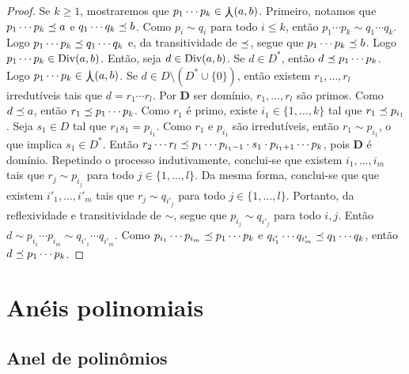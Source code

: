 \begin{proof}
Se $k \geq 1$, mostraremos que $p_1 \cdots p_k \in \mathop{\bigcurlywedge}(a,b)$. Primeiro, notamos que $p_1 \cdots p_k \preceq a$ e $q_1 \cdots q_k \preceq b$. Como $p_i \sim q_i$ para todo $i \leq k$, então $p_1 \cdots p_k \sim q_1 \cdots q_k$. Logo $p_1 \cdots p_k \preceq q_1 \cdots q_k$ e, da transitividade de $\preceq$, segue que $p_1 \cdots p_k \preceq b$. Logo $p_1 \cdots p_k \in \operatorname{Div}(a,b)$. Então, seja $d \in \operatorname{Div}(a,b)$. Se $d \in D^*$, então $d \preceq p_1 \cdots p_k$. Logo $p_1 \cdots p_k \in \mathop{\bigcurlywedge}(a,b)$. Se $d \in D \setminus (D^* \cup \{0\})$, então existem $r_1,\ldots,r_l$ irredutíveis tais que $d = r_1 \cdots r_l$. Por $\bm D$ ser domínio, $r_1,\ldots,r_l$ são primos. Como $d \preceq a$, então $r_1 \preceq p_1 \cdots p_k$. Como $r_1$ é primo, existe $i_1 \in \{1,\ldots,k\}$ tal que $r_1 \preceq p_{i_1}$. Seja $s_1 \in D$ tal que $r_1s_1 = p_{i_1}$. Como $r_1$ e $p_{i_1}$ são irredutíveis, então $r_1 \sim p_{i_1}$, o que implica $s_1 \in D^*$. Então $r_2 \cdots r_l \preceq p_1 \cdots p_{i_1-1} \cdot s_1 \cdot p_{i_1+1} \cdots p_k$, pois $\bm D$ é domínio. Repetindo o processo indutivamente, conclui-se que existem $i_1, \ldots,i_m$ tais que $r_j \sim p_{i_j}$ para todo $j \in \{1,\ldots,l\}$.
Da mesma forma, conclui-se que que existem $i'_1, \ldots,i'_m$ tais que $r_j \sim q_{i'_j}$ para todo $j \in \{1,\ldots,l\}$. Portanto, da reflexividade e transitividade de $\sim$, segue que $p_{i_j} \sim q_{i'_j}$ para todo $i,j$. Então $d \sim p_{i_1} \cdots p_{i_m} \sim q_{i'_1} \cdots q_{i'_m}$. Como $p_{i_1} \cdots p_{i_m} \preceq p_1 \cdots p_k$ e $q_{i'_1} \cdots q_{i'_m} \preceq q_1 \cdots q_k$, então $d \preceq p_1 \cdots p_k$.
\end{proof}







\section{Anéis polinomiais}

\subsection{Anel de polinômios}

